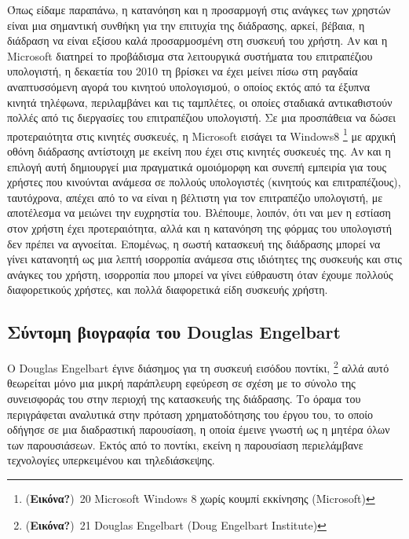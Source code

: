 \documentclass[
]{article}
\begin{document}
Όπως είδαμε παραπάνω, η κατανόηση και η προσαρμογή στις ανάγκες των
χρηστών είναι μια σημαντική συνθήκη για την επιτυχία της διάδρασης,
αρκεί, βέβαια, η διάδραση να είναι εξίσου καλά προσαρμοσμένη στη συσκευή
του χρήστη. Αν και η Microsoft διατηρεί το προβάδισμα στα λειτουργικά
συστήματα του επιτραπέζιου υπολογιστή, η δεκαετία του 2010 τη βρίσκει να
έχει μείνει πίσω στη ραγδαία αναπτυσσόμενη αγορά του κινητού
υπολογισμού, ο οποίος εκτός από τα έξυπνα κινητά τηλέφωνα, περιλαμβάνει
και τις ταμπλέτες, οι οποίες σταδιακά αντικαθιστούν πολλές από τις
διεργασίες του επιτραπέζιου υπολογιστή. Σε μια προσπάθεια να δώσει
προτεραιότητα στις κινητές συσκευές, η Microsoft εισάγει τα Windows8
\footnote{(\textbf{Εικόνα?})~20 Microsoft Windows 8 χωρίς κουμπί
  εκκίνησης (Microsoft)} με αρχική οθόνη διάδρασης αντίστοιχη με εκείνη
που έχει στις κινητές συσκευές της. Αν και η επιλογή αυτή δημιουργεί μια
πραγματικά ομοιόμορφη και συνεπή εμπειρία για τους χρήστες που κινούνται
ανάμεσα σε πολλούς υπολογιστές (κινητούς και επιτραπέζιους), ταυτόχρονα,
απέχει από το να είναι η βέλτιστη για τον επιτραπέζιο υπολογιστή, με
αποτέλεσμα να μειώνει την ευχρηστία του. Βλέπουμε, λοιπόν, ότι ναι μεν η
εστίαση στον χρήστη έχει προτεραιότητα, αλλά και η κατανόηση της φόρμας
του υπολογιστή δεν πρέπει να αγνοείται. Επομένως, η σωστή κατασκευή της
διάδρασης μπορεί να γίνει κατανοητή ως μια λεπτή ισορροπία ανάμεσα στις
ιδιότητες της συσκευής και στις ανάγκες του χρήστη, ισορροπία που μπορεί
να γίνει εύθραυστη όταν έχουμε πολλούς διαφορετικούς χρήστες, και πολλά
διαφορετικά είδη συσκευής χρήστη.

\hypertarget{ux3c3ux3cdux3bdux3c4ux3bfux3bcux3b7-ux3b2ux3b9ux3bfux3b3ux3c1ux3b1ux3c6ux3afux3b1-ux3c4ux3bfux3c5-douglas-engelbart}{%
\subsection{Σύντομη βιογραφία του Douglas
Engelbart}\label{ux3c3ux3cdux3bdux3c4ux3bfux3bcux3b7-ux3b2ux3b9ux3bfux3b3ux3c1ux3b1ux3c6ux3afux3b1-ux3c4ux3bfux3c5-douglas-engelbart}}

O Douglas Engelbart έγινε διάσημος για τη συσκευή εισόδου ποντίκι,
\footnote{(\textbf{Εικόνα?})~21 Douglas Engelbart (Doug Engelbart
  Institute)} αλλά αυτό θεωρείται μόνο μια μικρή παράπλευρη εφεύρεση σε
σχέση με το σύνολο της συνεισφοράς του στην περιοχή της κατασκευής της
διάδρασης. Το όραμα του περιγράφεται αναλυτικά στην πρόταση
χρηματοδότησης του έργου του, το οποίο οδήγησε σε μια διαδραστική
παρουσίαση, η οποία έμεινε γνωστή ως η μητέρα όλων των παρουσιάσεων.
Εκτός από το ποντίκι, εκείνη η παρουσίαση περιελάμβανε τεχνολογίες
υπερκειμένου και τηλεδιάσκεψης.
\end{document}

